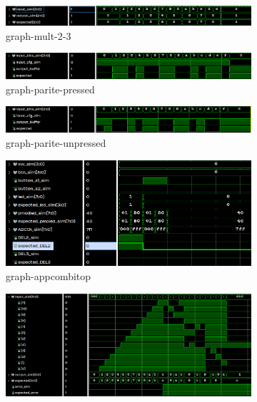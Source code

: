 \begin{figure}[H]
\begin{subfigure}{.496\linewidth}
		\centering
		\includegraphics[width=\textwidth]{assets/img/graph-mult-2-3.png}
		\caption{graph-mult-2-3}
	\end{subfigure}
	\begin{subfigure}{.496\linewidth}
		\centering
		\includegraphics[width=\textwidth]{assets/img/graph-parite-pressed.png}
		\caption{graph-parite-pressed}
	\end{subfigure}
	\begin{subfigure}{.496\linewidth}
		\centering
		\includegraphics[width=\textwidth]{assets/img/graph-parite-unpressed.png}
		\caption{graph-parite-unpressed}
	\end{subfigure}
	\begin{subfigure}{.49\linewidth}
		\centering
		\includegraphics[width=\textwidth]{assets/img/graph-appcombitop.png}
		\caption{graph-appcombitop}
	\end{subfigure}
	\begin{subfigure}{.496\linewidth}
		\centering
		\includegraphics[width=\textwidth]{assets/img/graph-thermo2bin.png}

\end{subfigure}
\end{figure}
